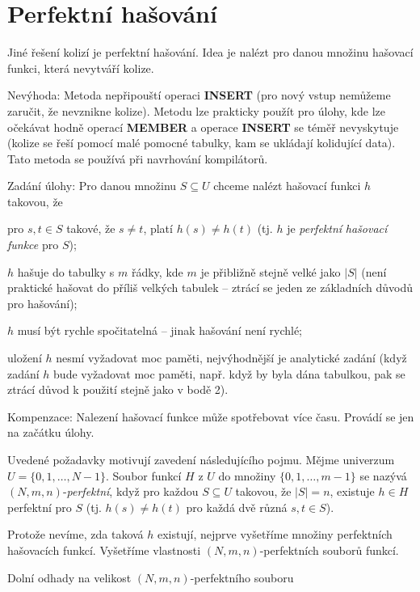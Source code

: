 \documentclass[a4paper,12pt]{article}
\begin{document}
\section{Perfektní hašování}

Jiné řešení kolizí je perfektní hašování. Idea 
je nalézt pro danou množinu hašovací funkci, která 
nevytváří kolize.

Nevýhoda: Metoda nepřipouští operaci {\bf INSERT }
(pro nový vstup nemůžeme zaručit, že nevznikne  
kolize). Metodu lze prakticky použít pro úlohy, kde lze 
očekávat hodně operací {\bf MEMBER} a operace {\bf INSERT} se 
téměř nevyskytuje (kolize se řeší pomocí malé pomocné 
tabulky, kam se ukládají kolidují\-cí data). Tato metoda se 
používá při navrhování kompilátorů.

Zadání úlohy: Pro danou množinu $S\subseteq 
U$ chceme 
nalézt hašo\-va\-cí funkci $h$ takovou, že
\roster
\item
pro $s,t\in S$ takové, že $s\ne t$, platí $h(s)\ne h(t)$ (tj. $
h$ je \emph{perfektní} \emph{hašovací} \emph{funkce} pro 
$S$); 
\item
$h$ hašuje do tabulky s $m$ řádky, kde $m$ je přibližně 
stejně velké jako $|S|$ (není praktické hašovat do příliš 
velkých tabulek -- ztrácí se jeden ze základních 
důvodů pro hašování); 
\item
$h$ musí být rychle spočitatelná -- jinak hašování 
není rychlé;
\item
uložení $h$ nesmí vyžadovat moc paměti, 
nejvýhodnější je ana\-lytické zadání (když zadání $
h$ bude 
vyžadovat moc paměti, např. když by byla dána tabulkou, 
pak se ztrácí důvod k použití stejně jako v 
bodě 2).
\endroster

Kompenzace: Nalezení hašovací funkce 
může spotřebovat více času. Provádí se jen na 
začátku úlohy. 

Uvedené požadavky motivují zavedení 
následujícího pojmu.\newline 
Mějme univerzum $U=\{0,1,\dots,N-1\}$. Soubor funkcí $H$ z 
$U$ do množiny $\{0,1,\dots,m-1\}$ se nazývá 
$(N,m,n)$-\emph{perfektní}, když pro každou $S\subseteq 
U$ 
takovou, že $|S|=n$, existuje $h\in H$ perfektní pro $S$ (tj. 
$h(s)\ne h(t)$ pro každá dvě různá $s,t\in S$).

Protože nevíme, zda taková $h$ existují, nejprve 
vyšetříme mno\-ži\-ny perfektních hašovacích 
funkcí. Vyšetříme vlastnosti $(N,m,n)$-perfektních 
souborů funkcí.

\subhead
Dolní odhady na velikost $(N,m,n)$-perfektního souboru
\endsubhead
\end{document}
